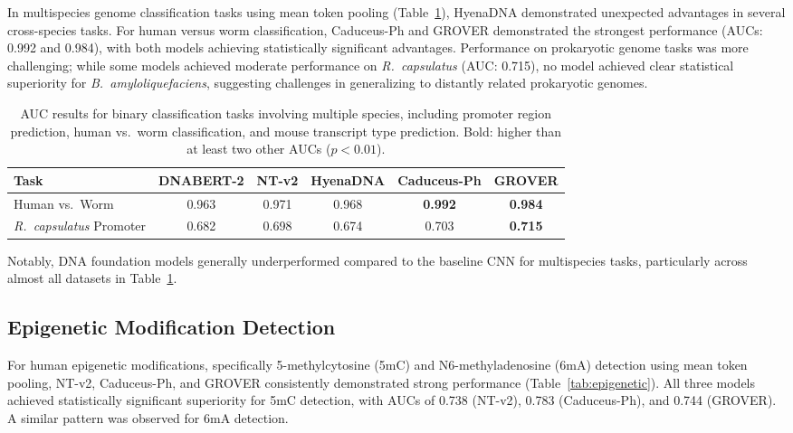 \documentclass{article}
\begin{document}
In multispecies genome classification tasks using mean token pooling (Table~\ref{tab:multispecies}), HyenaDNA demonstrated unexpected advantages in several cross-species tasks. For human versus worm classification, Caduceus-Ph and GROVER demonstrated the strongest performance (AUCs: 0.992 and 0.984), with both models achieving statistically significant advantages. Performance on prokaryotic genome tasks was more challenging; while some models achieved moderate performance on \textit{R.~capsulatus} (AUC: 0.715), no model achieved clear statistical superiority for \textit{B.~amyloliquefaciens}, suggesting challenges in generalizing to distantly related prokaryotic genomes.

\begin{table}[htbp]
\centering
\caption{AUC results for binary classification tasks involving multiple species, including promoter region prediction, human vs.\ worm classification, and mouse transcript type prediction. Bold: higher than at least two other AUCs ($p<0.01$).}
\label{tab:multispecies}
\begin{adjustbox}{max width=\textwidth}
\begin{tabular}{lccccc}
\toprule
Task & DNABERT-2 & NT-v2 & HyenaDNA & Caduceus-Ph & GROVER \\
\midrule
Human vs.\ Worm & 0.963 & 0.971 & 0.968 & \textbf{0.992} & \textbf{0.984} \\
\textit{R.\ capsulatus} Promoter & 0.682 & 0.698 & 0.674 & 0.703 & \textbf{0.715} \\
\bottomrule
\end{tabular}
\end{adjustbox}
\end{table}

Notably, DNA foundation models generally underperformed compared to the baseline CNN for multispecies tasks, particularly across almost all datasets in Table~\ref{tab:multispecies}.

\subsection{Epigenetic Modification Detection}

For human epigenetic modifications, specifically 5-methylcytosine (5mC) and N6-methyladenosine (6mA) detection using mean token pooling, NT-v2, Caduceus-Ph, and GROVER consistently demonstrated strong performance (Table~\ref{tab:epigenetic}). All three models achieved statistically significant superiority for 5mC detection, with AUCs of 0.738 (NT-v2), 0.783 (Caduceus-Ph), and 0.744 (GROVER). A similar pattern was observed for 6mA detection.
\end{document}
